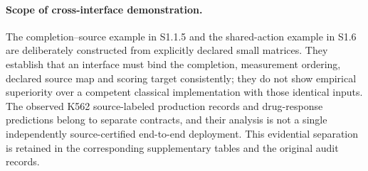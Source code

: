 \documentclass[11pt]{article}
\begin{document}
\paragraph{Scope of cross-interface demonstration.}
The completion--source example in S1.1.5 and the shared-action example in S1.6 are deliberately constructed from explicitly declared small matrices. They establish that an interface must bind the completion, measurement ordering, declared source map and scoring target consistently; they do not show empirical superiority over a competent classical implementation with those identical inputs. The observed K562 source-labeled production records and drug-response predictions belong to separate contracts, and their analysis is not a single independently source-certified end-to-end deployment. This evidential separation is retained in the corresponding supplementary tables and the original audit records.
\end{document}
